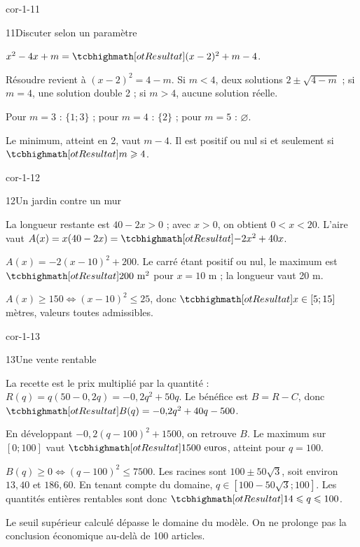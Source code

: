 \begin{blocLivre}{cor-1-11}
\begin{corrige}{11}{Discuter selon un paramètre}
\begin{questions}
\item $x^2-4x+m=\res{(x-2)^2+m-4}$.
\item Résoudre revient à $(x-2)^2=4-m$. Si $m<4$, deux solutions
$2\pm\sqrt{4-m}$ ; si $m=4$, une solution double 2 ; si $m>4$, aucune solution réelle.
\item Pour $m=3$ : $\{1;3\}$ ; pour $m=4$ : $\{2\}$ ; pour $m=5$ : $\varnothing$.
\item Le minimum, atteint en 2, vaut $m-4$. Il est positif ou nul si et seulement si $\res{m\geq4}$.
\end{questions}
\end{corrige}
\end{blocLivre}
\begin{blocLivre}{cor-1-12}
\begin{corrige}{12}{Un jardin contre un mur}
\begin{questions}
\item La longueur restante est $40-2x>0$ ; avec $x>0$, on obtient $0<x<20$.
L'aire vaut $A(x)=x(40-2x)=\res{-2x^2+40x}$.
\item $A(x)=-2(x-10)^2+200$. Le carré étant positif ou nul, le maximum est
$\res{200\text{ m}^2}$ pour $x=10$ m ; la longueur vaut 20 m.
\item $A(x)\geq150\iff(x-10)^2\leq25$,
donc $\res{x\in[5;15]}$ mètres, valeurs toutes admissibles.
\end{questions}
\end{corrige}
\end{blocLivre}
\begin{blocLivre}{cor-1-13}
\begin{corrige}{13}{Une vente rentable}
\begin{questions}
\item La recette est le prix multiplié par la quantité :
$R(q)=q(50-0{,}2q)=-0{,}2q^2+50q$.
Le bénéfice est $B=R-C$, donc $\res{B(q)=-0{,}2q^2+40q-500}$.
\item En développant $-0{,}2(q-100)^2+1500$, on retrouve $B$.
Le maximum sur $[0;100]$ vaut $\res{1500\text{ euros}}$, atteint pour $q=100$.
\item $B(q)\geq0\iff(q-100)^2\leq7500$.
Les racines sont $100\pm50\sqrt3$, soit environ $13{,}40$ et $186{,}60$.
En tenant compte du domaine, $q\in[100-50\sqrt3;100]$.
Les quantités entières rentables sont donc $\res{14\leq q\leq100}$.
\end{questions}
\begin{attention}
Le seuil supérieur calculé dépasse le domaine du modèle. On ne prolonge pas
la conclusion économique au-delà de 100 articles.
\end{attention}
\end{corrige}
\end{blocLivre}

